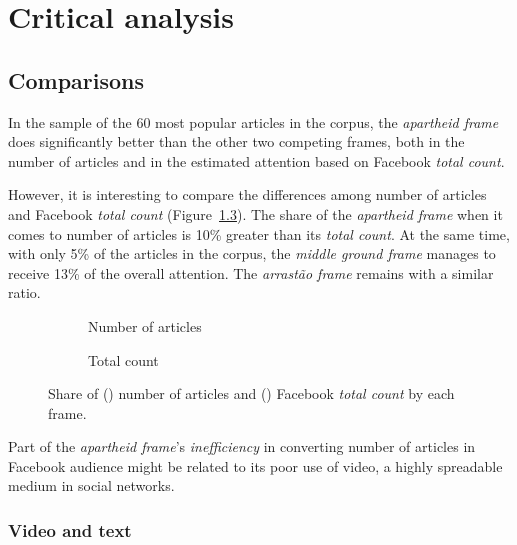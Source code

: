 \chapter{Critical analysis}

\section{Comparisons}

In the sample of the 60 most popular articles in the corpus, the \emph{apartheid frame} does significantly better than the other two competing frames, both in the number of articles and in the estimated attention based on Facebook \emph{total count}.

However, it is interesting to compare the differences among number of articles and Facebook \emph{total count} (Figure~\ref{artigos_atencao_cluster}). The share of the \emph{apartheid frame} when it comes to number of articles is 10\% greater than its \emph{total count}. At the same time, with only 5\% of the articles in the corpus, the \emph{middle ground frame} manages to receive 13\% of the overall attention. The \emph{arrastão frame} remains with a similar ratio.

\begin{figure}
\centering
\begin{subfigure}[b]{0.3\textwidth}
\centering

\caption{Number of articles}\label{subfig:p1}
\end{subfigure}
\begin{subfigure}[b]{0.3\textwidth}
\centering

\caption{Total count}\label{subfig:p2}
\end{subfigure}
\begin{subfigure}[t]{0.3\textwidth}
\centering

\end{subfigure}
\caption{Share of () number of articles and () Facebook \emph{total count} by each frame.}\label{artigos_atencao_cluster}
\end{figure}

Part of the \emph{apartheid frame}'s \emph{inefficiency} in converting number of articles in Facebook audience might be related to its poor use of video, a highly spreadable medium in social networks.

\subsection*{Video and text}

